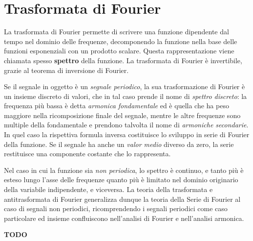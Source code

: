 \documentclass[a4paper, titlepage, oneside]{scrbook}
\begin{document}
\section{Trasformata di Fourier}
La trasformata di Fourier permette di scrivere una funzione dipendente dal tempo nel dominio delle frequenze, decomponendo  la funzione nella base delle funzioni 
esponenziali con un prodotto scalare. Questa rappresentazione viene chiamata spesso \textbf{spettro} della funzione. La trasformata di Fourier è invertibile, grazie
al teorema di inversione di Fourier.

Se il segnale in oggetto è un \textit{segnale periodico}, la sua trasformazione di Fourier è un insieme discreto di valori, che in tal caso prende il nome di
\textit{spettro discreto}: la frequenza più bassa è detta \textit{armonica fondamentale} ed è quella che ha peso maggiore nella ricomposizione finale del segnale,
mentre le altre frequenze sono multiple della fondamentale e prendono talvolta il nome di \textit{armoniche secondarie}. In quel caso la rispettiva formula inversa
costituisce lo sviluppo in serie di Fourier della funzione. Se il segnale ha anche un \textit{valor medio} diverso da zero, la serie restituisce una componente costante
che lo rappresenta.

Nel caso in cui la funzione sia \textit{non periodica}, lo spettro è continuo, e tanto più è esteso lungo l'asse delle frequenze quanto più è limitato
nel dominio originario della variabile indipendente, e viceversa. La teoria della trasformata e antitrasformata di Fourier generalizza dunque la teoria 
della Serie di Fourier al caso di segnali non periodici, ricomprendendo i segnali periodici come caso particolare ed insieme confluiscono nell'analisi di 
Fourier e nell'analisi armonica.

\textbf{TODO}


\end{document}
